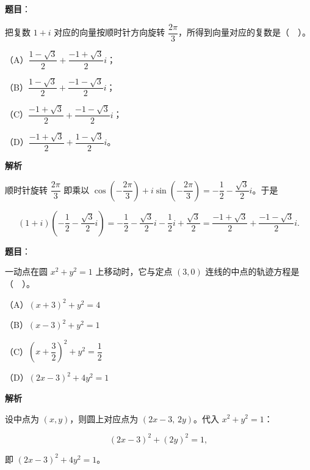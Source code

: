 \begin{answer}

\textbf{题目}：

把复数 $1+i$ 对应的向量按顺时针方向旋转 $\dfrac{2\pi}{3}$，所得到向量对应的复数是（　）。

（A）$\dfrac{1-\sqrt3}{2}+\dfrac{-1+\sqrt3}{2}i$；

（B）$\dfrac{1-\sqrt3}{2}+\dfrac{-1-\sqrt3}{2}i$；

（C）$\dfrac{-1+\sqrt3}{2}+\dfrac{-1-\sqrt3}{2}i$；

（D）$\dfrac{-1+\sqrt3}{2}+\dfrac{1-\sqrt3}{2}i$。

\textbf{解析}

顺时针旋转 $\dfrac{2\pi}{3}$ 即乘以 $\cos\left(-\dfrac{2\pi}{3}\right)+i\sin\left(-\dfrac{2\pi}{3}\right)=-\dfrac12-\dfrac{\sqrt3}{2}i$。于是

\nopagebreak[4]
\[
(1+i)\left(-\frac12-\frac{\sqrt3}{2}i\right)
=-\frac12-\frac{\sqrt3}{2}i-\frac12 i+\frac{\sqrt3}{2}
=\frac{-1+\sqrt3}{2}+\frac{-1-\sqrt3}{2}i.
\]


\end{answer}
\begin{answer}

\textbf{题目}：

一动点在圆 $x^2+y^2=1$ 上移动时，它与定点 $(3,0)$ 连线的中点的轨迹方程是（　）。

（A）$(x+3)^2+y^2=4$

（B）$(x-3)^2+y^2=1$

（C）$\left(x+\dfrac32\right)^2+y^2=\dfrac12$

（D）$(2x-3)^2+4y^2=1$

\textbf{解析}

设中点为 $(x,y)$，则圆上对应点为 $(2x-3,\,2y)$。代入 $x^2+y^2=1$：

\nopagebreak[4]
\[
(2x-3)^2+(2y)^2=1,
\]

即 $(2x-3)^2+4y^2=1$。


\end{answer}
